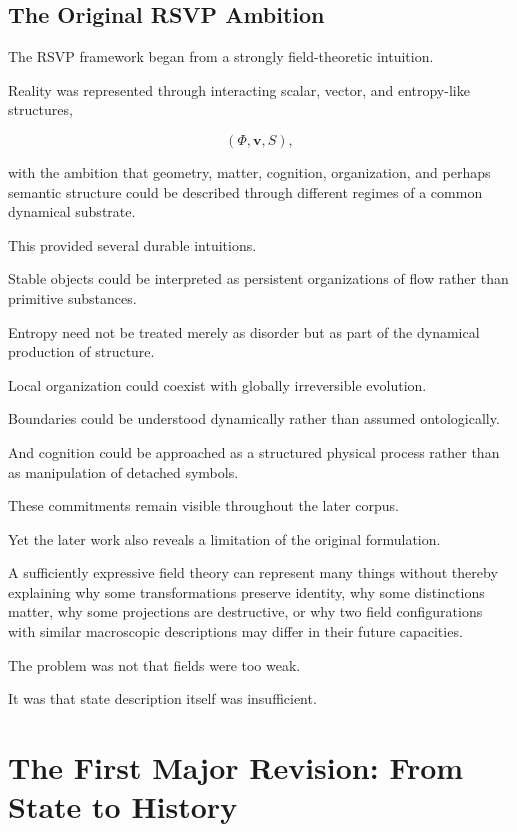 \documentclass[11pt]{article}
\theoremstyle{remark}
\newcommand{\RSVP}{\textsc{RSVP}}
\begin{document}
\subsection{The Original RSVP Ambition}

The \RSVP{} framework began from a strongly field-theoretic intuition.

Reality was represented through interacting scalar, vector, and entropy-like structures,

\begin{equation}
(\Phi,\mathbf{v},S),
\end{equation}

with the ambition that geometry, matter, cognition, organization, and perhaps semantic structure could be described through different regimes of a common dynamical substrate.

This provided several durable intuitions.

Stable objects could be interpreted as persistent organizations of flow rather than primitive substances.

Entropy need not be treated merely as disorder but as part of the dynamical production of structure.

Local organization could coexist with globally irreversible evolution.

Boundaries could be understood dynamically rather than assumed ontologically.

And cognition could be approached as a structured physical process rather than as manipulation of detached symbols.

These commitments remain visible throughout the later corpus.

Yet the later work also reveals a limitation of the original formulation.

A sufficiently expressive field theory can represent many things without thereby explaining why some transformations preserve identity, why some distinctions matter, why some projections are destructive, or why two field configurations with similar macroscopic descriptions may differ in their future capacities.

The problem was not that fields were too weak.

It was that state description itself was insufficient.

\section{The First Major Revision: From State to History}
\end{document}
